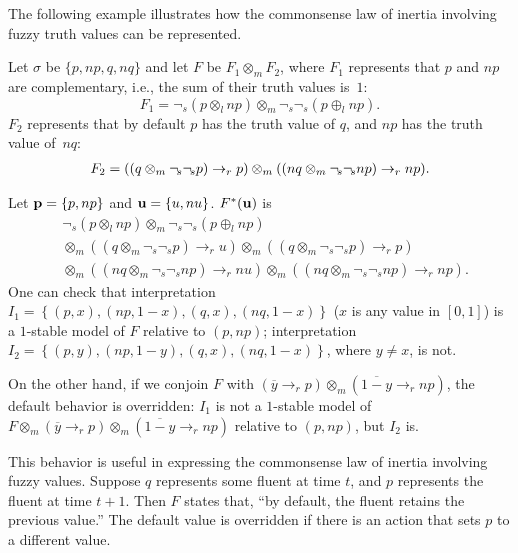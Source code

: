 \documentclass[runningheads]{llncs}
\def\o{\overline}
\def\ba{\begin{array}}
\def\ea{\end{array}}
\def\sneg{\sim\!\!}
\def\rar{\rightarrow}
\def\fand{\otimes}
\def\for{\oplus}
\begin{document}
The following example illustrates how the commonsense law of inertia involving fuzzy truth values can be represented. 


\begin{example}\label{ex:default}
Let $\sigma$ be $\{p, np, q, nq\}$ 
and let $F$ be $F_1\fand_m F_2$, where $F_1$ represents that
$p$ and $np$ are complementary, i.e., the sum of their truth
values is~$1$:
\[ 
   F_1=\neg_{\!s}(p \fand_l np) \fand_m \neg_{\!s} \neg_{\!s}(p \for_l np).  
\]
$F_2$ represents that by default $p$ has the truth value of $q$, and
$np$ has the truth value of~$nq$:
\[
\ba l
   F_2= ((q \fand_m \neg_{\!s} \neg_{\!s} p) \rar_r p) 
      \fand_m ((nq \fand_m \neg_{\!s} \neg_{\!s}  np) \rar_r np). 
\ea
\]


Let ${\bf p} = \left\{p, np\right\}$ and ${\bf u}=\{u, nu\}$.
$F^*({\bf u})$ is
\[
\ba {rl}
    & \neg_{\!s}(p \fand_l np) \fand_m
                \neg_{\!s} \neg_{\!s}(p \for_l np)  \\
    &\fand_m ((q \fand_m \neg_{\!s} \neg_{\!s} p) \rar_r u) 
         \fand_m ((q\fand_m \neg_{\!s} \neg_{\!s} p) \rar_r p) \\ 
    & \fand_m ((nq \fand_m \neg_{\!s} \neg_{\!s}  np) \rar_r nu) 
      \fand_m ((nq \fand_m \neg_{\!s} \neg_{\!s}  np) \rar_r np). 
\ea 
\]
One can check that interpretation 
$I_1 = \left\{(p, x), (np, 1-x), (q, x), (nq, 1-x)\right\}$
($x$ is any value in $[0,1]$)
is a $1$-stable model of $F$ relative to $(p, np)$; 
interpretation $I_2 = \left\{(p, y), (np, 1-y), (q, x),
  (nq, 1-x)\right\}$, where $y \ne x$, is not. 

On the other hand, if we conjoin $F$ with $(\o{y}\rar_r p)\fand_m (\o{1-y}\rar_r np)$, the default behavior is overridden: $I_1$ is not a $1$-stable model of \hbox{$F\fand_m (\o{y} \rar_r p)\fand_m (\o{1-y}\rar_r np)$} relative to $(p,np)$, but $I_2$ is. 

This behavior is useful in expressing the commonsense law of inertia
involving fuzzy values. 
Suppose $q$ represents some fluent at time $t$, and $p$
represents the fluent at time $t\!+\!1$. Then $F$ states that, ``by
default, the fluent retains the previous value.'' The default value is
overridden if there is an action that sets $p$ to a different value. 
\end{example}
\end{document}
